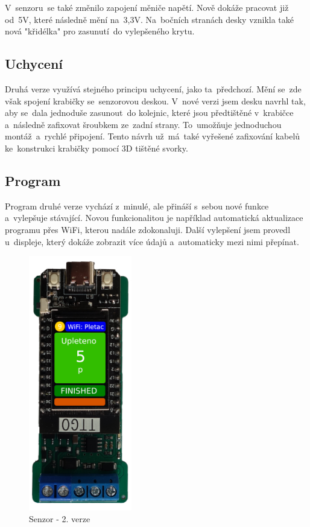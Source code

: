 V~senzoru~se také změnilo zapojení měniče napětí.
Nově dokáže pracovat již od~5V, které následně mění na~3,3V.
Na~bočních stranách desky vznikla také nová "křidélka" pro zasunutí~do vylepšeného krytu.



\subsection{Uchycení}
Druhá verze využívá stejného principu uchycení, jako ta~předchozí. 
Mění se~zde však spojení krabičky se~senzorovou deskou. 
V~nové verzi jsem desku navrhl tak, aby se~dala jednoduše zasunout~do kolejnic, které jsou předtištěné v~krabičce a~následně zafixovat šroubkem ze~zadní strany.
To~umožňuje jednoduchou montáž~a~rychlé připojení.
Tento návrh už~má~také vyřešené zafixování kabelů ke~konstrukci krabičky pomocí 3D tištěné svorky.


\subsection{Program}
Program druhé verze vychází z~minulé, ale přináší s~sebou nové funkce a~vylepšuje stávající.
Novou funkcionalitou je například automatická aktualizace programu přes WiFi, kterou nadále zdokonaluji.
Další vylepšení jsem provedl u~displeje, který dokáže zobrazit více údajů a~automaticky mezi nimi přepínat.

\begin{figure}[htbp]
    \centering
    \includegraphics[width=0.4\textwidth]{img/V2-deska-esp-screen.png}
    \caption{Senzor - 2. verze}
    \label{fig:SenzorV2}
\end{figure}


\newpage